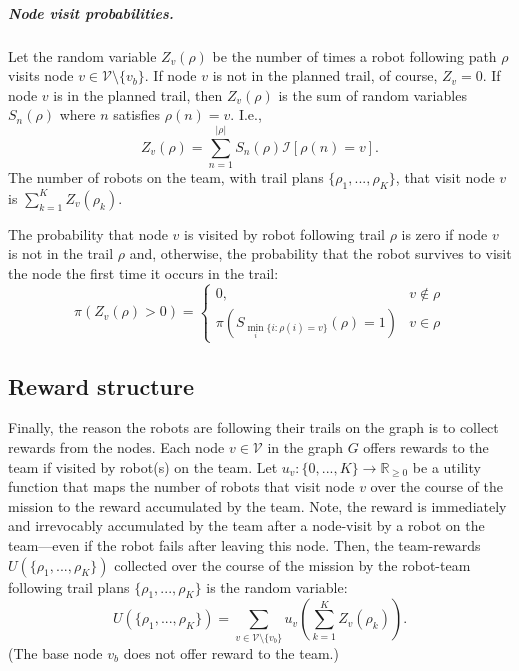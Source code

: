 \documentclass[11pt, oneside]{article}
\begin{document}
\subparagraph{Node visit probabilities.} 
Let the random variable $Z_v(\rho)$ be the number of times a robot following path $\rho$ visits node $v\in \mathcal{V} \setminus \{v_b\}$. 
If node $v$ is not in the planned trail, of course, $Z_v=0$. If node $v$ is in the planned trail, then $Z_v(\rho)$ is the sum of random variables $S_n(\rho)$ where $n$ satisfies $\rho(n)=v$. I.e.,
\begin{equation}
	Z_v(\rho) = \sum_{n=1}^{\lvert \rho \rvert} S_n(\rho) \mathcal{I}[\rho(n) = v].
\end{equation}
The number of robots on the team, with trail plans $\{\rho_1,...,\rho_K\}$, that visit node $v$ is $\sum_{k=1}^K Z_v(\rho_k)$.

The probability that node $v$ is visited by robot following trail $\rho$ is zero if node $v$ is not in the trail $\rho$ and, otherwise, the probability that the robot survives to visit the node the first time it occurs in the trail:
\begin{equation}
	\pi(Z_v(\rho) > 0)= 
	\begin{cases}
	 0, & v \notin \rho \\
	 \pi(S_{\min_{i} \{i : \rho(i) =v\} } (\rho) = 1) & v \in \rho
	\end{cases} \label{eq:node_visisted}
\end{equation}



\subsection{Reward structure}
Finally, the reason the robots are following their trails on the graph is to collect rewards from the nodes.
Each node $v\in \mathcal{V}$ in the graph $G$ offers rewards to the team if visited by robot(s) on the team. 
Let $u_v: \{0, ..., K\} \rightarrow \mathbb{R}_{\geq 0}$ be a utility function that maps the number of robots that visit node $v$ over the course of the mission to the reward accumulated by the team. 
Note, the reward is immediately and irrevocably accumulated by the team after a node-visit by a robot on the team---even if the robot fails after leaving this node.
Then, the team-rewards $U(\{\rho_1,...,\rho_K\})$ collected over the course of the mission by the robot-team following trail plans $\{\rho_1, ..., \rho_K\}$ is the random variable:
\begin{equation}
U(\{\rho_1,...,\rho_K\}) = \sum_{v\in\mathcal{V}\setminus \{v_b\}} u_v\left ( \sum_{k=1}^K Z_v(\rho_k) \right).
\end{equation}
(The base node $v_b$ does not offer reward to the team.)
\end{document}
